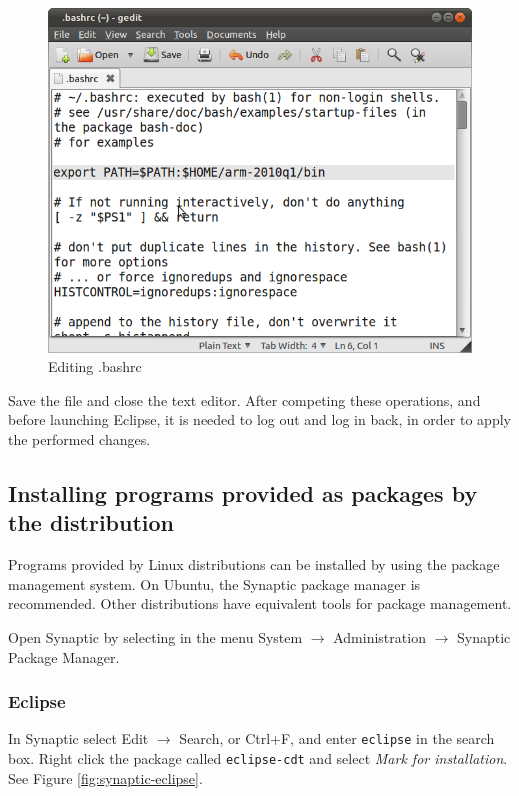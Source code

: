 \documentclass[a4paper, 10pt]{article}
\begin{document}
    \begin{figure}[H]
    \centering
        \includegraphics[width=\textwidth]{./install-guide-linux-images/editing-bashrc.png}
        \caption{Editing .bashrc}
        \label{fig:editing-bashrc}
    \end{figure}

Save the file and close the text editor.
After competing these operations, and before launching Eclipse, it is needed to
log out and log in back, in order to apply the performed changes.

\subsection{Installing programs provided as packages by the distribution}

Programs provided by Linux distributions can be installed by using the package management system.
On Ubuntu, the Synaptic package manager is recommended.
Other distributions have equivalent tools for package management.

Open Synaptic by selecting in the menu System $\rightarrow$ Administration $\rightarrow$
Synaptic Package Manager.

\subsubsection{Eclipse}

In Synaptic select Edit $\rightarrow$ Search, or Ctrl+F, and enter \verb+eclipse+
in the search box. Right click the package called
\verb+eclipse-cdt+ and select \emph{Mark for installation}.
See Figure \ref{fig:synaptic-eclipse}.
\end{document}
